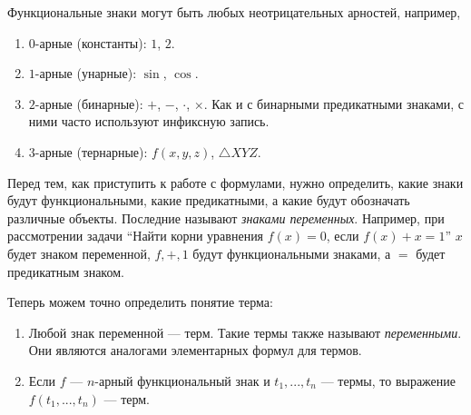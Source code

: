 Функциональные знаки могут быть любых неотрицательных арностей, например,
\begin{enumerate}
  \item{}$0$-арные (константы): $1$, $2$.
  \item{}$1$-арные (унарные): $\sin$, $\cos$.
  \item{}$2$-арные (бинарные): $+$, $-$, $\cdot$, $\times$.
  Как и с бинарными предикатными знаками, с ними часто используют инфиксную запись.
  \item{}$3$-арные (тернарные): $f(x,y,z)$, $\triangle XYZ$.
\end{enumerate}

Перед тем, как приступить к работе с формулами, нужно определить, какие
знаки будут функциональными, какие предикатными, а какие будут
обозначать различные объекты.
Последние называют {\it знаками переменных}.
Например, при рассмотрении задачи ``Найти корни уравнения $f(x)=0$,
если $f(x)+x=1$'' $x$ будет знаком переменной, $f,+,1$ будут
функциональными знаками, а $=$ будет предикатным знаком.

Теперь можем точно определить понятие терма:
\begin{enumerate}
  \item{}Любой знак переменной --- терм. Такие термы также
  называют {\it переменными}. Они являются аналогами элементарных формул
  для термов.

  \item{}Если $f$ --- $n$-арный функциональный знак и $t_1,...,t_{n}$ --- термы,
  то выражение $f(t_1,...,t_{n})$ --- терм.
\end{enumerate}

